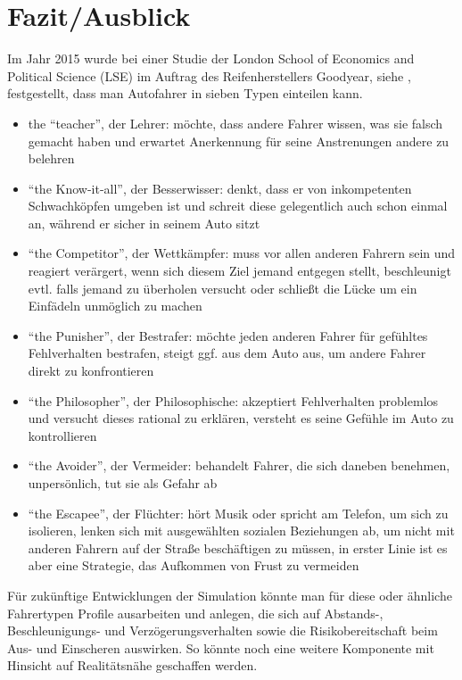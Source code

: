 \section{Fazit/Ausblick}
\label{sec:fazit-ausblick}






Im Jahr 2015 wurde bei einer Studie der London School of Economics and Political Science (LSE) im Auftrag des Reifenherstellers Goodyear, siehe \cite{fahrertyp}, festgestellt, dass man Autofahrer in sieben Typen einteilen kann.

\begin{itemize}
\itemsep0em
	\item the \enquote{teacher}, der Lehrer: möchte, dass andere Fahrer wissen, was sie falsch gemacht haben und erwartet Anerkennung für seine Anstrenungen andere zu belehren
	\item \enquote{the Know-it-all}, der Besserwisser: denkt, dass er von inkompetenten Schwachköpfen umgeben ist und schreit diese gelegentlich auch schon einmal an, während er sicher in seinem Auto sitzt
	\item \enquote{the Competitor}, der Wettkämpfer: muss vor allen anderen Fahrern sein und reagiert verärgert, wenn sich diesem Ziel jemand entgegen stellt, beschleunigt evtl. falls jemand zu überholen versucht oder schließt die Lücke um ein Einfädeln unmöglich zu machen
	\item \enquote{the Punisher}, der Bestrafer: möchte jeden anderen Fahrer für gefühltes Fehlverhalten bestrafen, steigt ggf. aus dem Auto aus, um andere Fahrer direkt zu konfrontieren
	\item \enquote{the Philosopher}, der Philosophische: akzeptiert Fehlverhalten problemlos und versucht dieses rational zu erklären, versteht es seine Gefühle im Auto zu kontrollieren
	\item \enquote{the Avoider}, der Vermeider: behandelt Fahrer, die sich daneben benehmen, unpersönlich, tut sie als Gefahr ab
	\item \enquote{the Escapee}, der Flüchter: hört Musik oder spricht am Telefon, um sich zu isolieren, lenken sich mit ausgewählten sozialen Beziehungen ab, um nicht mit anderen Fahrern auf der Straße beschäftigen zu müssen, in erster Linie ist es aber eine Strategie, das Aufkommen von Frust zu vermeiden
\end{itemize}

Für zukünftige Entwicklungen der Simulation könnte man für diese oder ähnliche Fahrertypen Profile ausarbeiten und anlegen, die sich auf Abstands-, Beschleunigungs- und Verzögerungsverhalten sowie die Risikobereitschaft beim Aus- und Einscheren auswirken.
So könnte noch eine weitere Komponente mit Hinsicht auf Realitätsnähe geschaffen werden. 

